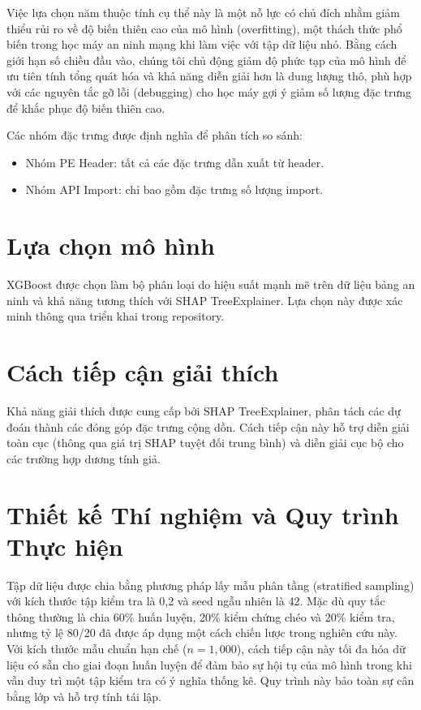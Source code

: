 \documentclass[conference]{IEEEtran}
\begin{document}
Việc lựa chọn năm thuộc tính cụ thể này là một nỗ lực có chủ đích nhằm giảm thiểu rủi ro về độ biến thiên cao của mô hình (overfitting), một thách thức phổ biến trong học máy an ninh mạng khi làm việc với tập dữ liệu nhỏ. Bằng cách giới hạn số chiều đầu vào, chúng tôi chủ động giảm độ phức tạp của mô hình để ưu tiên tính tổng quát hóa và khả năng diễn giải hơn là dung lượng thô, phù hợp với các nguyên tắc gỡ lỗi (debugging) cho học máy gợi ý giảm số lượng đặc trưng để khắc phục độ biến thiên cao.

Các nhóm đặc trưng được định nghĩa để phân tích so sánh:
\begin{itemize}
    \item Nhóm PE Header: tất cả các đặc trưng dẫn xuất từ header.
    \item Nhóm API Import: chỉ bao gồm đặc trưng số lượng import.
\end{itemize}

\section{Lựa chọn mô hình}
XGBoost được chọn làm bộ phân loại do hiệu suất mạnh mẽ trên dữ liệu bảng an ninh và khả năng tương thích với SHAP TreeExplainer. Lựa chọn này được xác minh thông qua triển khai trong repository.

\section{Cách tiếp cận giải thích}
Khả năng giải thích được cung cấp bởi SHAP TreeExplainer, phân tách các dự đoán thành các đóng góp đặc trưng cộng dồn. Cách tiếp cận này hỗ trợ diễn giải toàn cục (thông qua giá trị SHAP tuyệt đối trung bình) và diễn giải cục bộ cho các trường hợp dương tính giả.

\section{Thiết kế Thí nghiệm và Quy trình Thực hiện}
Tập dữ liệu được chia bằng phương pháp lấy mẫu phân tầng (stratified sampling) với kích thước tập kiểm tra là 0,2 và seed ngẫu nhiên là 42. Mặc dù quy tắc thông thường là chia 60\% huấn luyện, 20\% kiểm chứng chéo và 20\% kiểm tra, nhưng tỷ lệ 80/20 đã được áp dụng một cách chiến lược trong nghiên cứu này. Với kích thước mẫu chuẩn hạn chế ($n=1,000$), cách tiếp cận này tối đa hóa dữ liệu có sẵn cho giai đoạn huấn luyện để đảm bảo sự hội tụ của mô hình trong khi vẫn duy trì một tập kiểm tra có ý nghĩa thống kê. Quy trình này bảo toàn sự cân bằng lớp và hỗ trợ tính tái lập.
\end{document}
